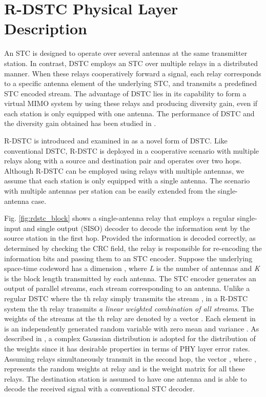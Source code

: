 \documentclass[peerreview,draftcls,onecolumn,12pt,a4paper]{IEEEtran}
\begin{document}
\vspace{-0.2in}
\section{R-DSTC Physical Layer Description}
\label{R-DSTC}

An STC is designed to operate over several antennas at the same transmitter station. In contrast, DSTC employs an STC over multiple relays in a distributed manner. When these relays cooperatively forward a signal, each relay corresponds to a specific antenna element of the underlying STC, and transmits a predefined STC encoded stream. The advantage of DSTC lies in its capability to form a virtual MIMO system by using these relays and producing diversity gain, even if each station is only equipped with one antenna. The performance of DSTC and the diversity gain obtained has been studied in \cite{La03}. 

R-DSTC is introduced and examined in
\cite{sirkeci_scaglione_mergen_2007_SP} as a novel form of DSTC.
Like conventional DSTC, R-DSTC is deployed in a cooperative
scenario with multiple relays along with a source and destination
pair and operates over two hops. Although R-DSTC can be employed
using relays with multiple antennas, we assume that each station
is only equipped with a single antenna. The scenario with multiple
antennas per station can be easily extended from the
single-antenna case.

Fig. \ref{fig:rdstc_block} shows a single-antenna relay that
employs a regular single-input and single output (SISO) decoder to
decode the information sent by the source station in the first
hop. Provided the information is decoded correctly, as determined
by checking the CRC field, the relay is responsible for
re-encoding the information bits and passing them to an STC
encoder. Suppose the underlying space-time codeword has a
dimension , where \emph{L} is the number of antennas
and \emph{K} is the block length transmitted by each antenna. The
STC encoder generates an output of  parallel streams, each
stream corresponding to an antenna. Unlike a regular DSTC where
the th relay simply transmits the stream , in a R-DSTC
system the th relay transmits \emph{a linear weighted
combination of all  streams}. The weights of the  streams at
the th relay are denoted by a vector . Each element in  is an
independently generated random variable with zero mean and
variance . As described in
\cite{sirkeci_scaglione_mergen_2007_SP}, a complex Gaussian
distribution is adopted for the distribution of the weights since
it has desirable properties in terms of PHY layer error rates.
Assuming  relays simultaneously transmit in the second hop, the
vector , where , represents the
random weights at relay  and  is the weight matrix for all these  relays.
The destination station is assumed to have one antenna and is able
to decode the received signal with a conventional STC decoder. 
\end{document}
